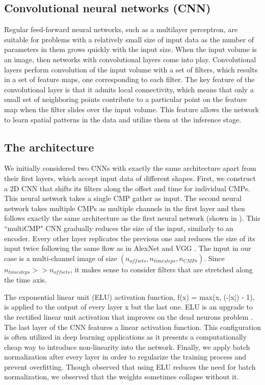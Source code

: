 \documentclass[paper,twocolomn]{geophysics}
\begin{document}
\subsection{Convolutional neural networks (CNN)}
Regular feed-forward neural networks, such as a multilayer perceptron, are suitable for problems with a relatively small size of input data as the number of parameters in them grows quickly with the input size. When the input volume is an image, then networks with convolutional layers come into play. Convolutional layers perform convolution of the input volume with a set of filters, which results in a set of feature maps, one corresponding to each filter. The key feature of the convolutional layer is that it admits local connectivity, which means that only a small set of neighboring points contribute to a particular point on the feature map when the filter slides over the input volume. This feature allows the network to learn spatial patterns in the data and utilize them at the inference stage.

\subsection{The architecture}
We initially considered two CNNs with exactly the same architecture apart from their first layers, which accept input data of different shapes.
%
First, we construct a 2D CNN that shifts its filters along the offset and time for individual CMPs. This neural network takes a single CMP gather as input.
The second neural network takes multiple CMPs as multiple channels in the first layer and then follows exactly the same architecture as the first neural network (shown in ). 
This ``multiCMP" CNN gradually reduces the size of the input, similarly to an encoder. Every other layer replicates the previous one and reduces the size of its input twice following the same flow as in AlexNet \citep{krizhevsky2012imagenet} and VGG \citep{simonyan2014very}. The input in our case is a multi-channel image of size $(n_{offsets}, n_{timesteps}, n_{CMPs})$. Since $n_{timesteps} >> n_{offsets}$, it makes sense to consider filters that are stretched along the time axis. 

The exponential linear unit (ELU) activation function,
\beq
f(x) = max(x, \exp(-|x|) - 1),
\eeq
is applied to the output of every layer x but the last one. ELU is an upgrade to the rectified linear unit activation that improves on the dead neurons problem \citep{clevert2015fast}. The last layer of the CNN features a linear activation function. This configuration is often utilized in deep learning applications as it presents a computationally cheap way to introduce non-linearity into the network. 
Finally, we apply batch normalization after every layer in order to regularize the training process and prevent overfitting. Though \cite{clevert2015fast} observed that using ELU reduces the need for batch normalization, we observed that the weights sometimes collapse without it.
\end{document}
